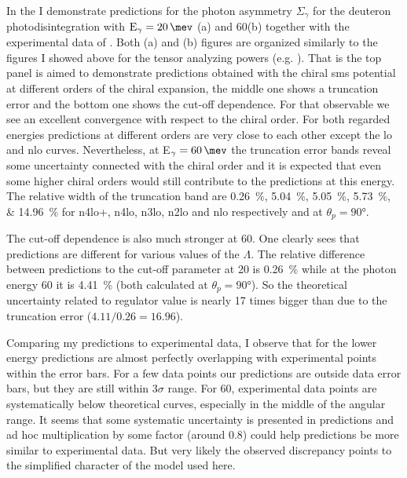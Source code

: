     In the  I demonstrate predictions
    for the photon asymmetry $\Sigma_\gamma$ for the 
    deuteron photodisintegration with $\text{E}_\gamma=\SI{20}{\mev}$ (a)
    and \SI{60}{\mev}(b) together with the experimental data of 
    \cite{KRAUSE1992_asymetry, depascale_asymmetry, Barannik_asymetry, Vnukov_asymmetry}.
    Both (a) and (b) figures are organized similarly to the 
    figures I showed above for the tensor analyzing powers (e.g. ).
    That is the top panel is aimed to demonstrate predictions obtained
    with the chiral \gls{sms} potential at different orders of the chiral expansion,
    the middle one shows a truncation error and the bottom one shows 
    the cut-off dependence. For that observable we see an excellent 
    convergence with respect to the chiral order. For both regarded 
    energies predictions at different orders are very close to each other
    except the \gls{lo} and \gls{nlo} curves. Nevertheless, at E$_\gamma = \SI{60}{\mev}$
    the truncation error bands reveal some uncertainty connected 
    with the chiral order and it is expected that even some higher chiral 
    orders would still contribute to the predictions at this energy.
    The relative width of the truncation band are 
    \SIlist{0.26;5.04;5.05;5.73;14.96}{\percent} for \gls{n4lo+}, \gls{n4lo}, \gls{n3lo},
    \gls{n2lo} and \gls{nlo} respectively and at $\theta_p=\ang{90}$.

    The cut-off dependence is also much stronger at \SI{60}{\mev}. One clearly sees
    that predictions are different for various values of the $\Lambda$.
    The relative difference between predictions to the cut-off parameter at \SI{20}{\mev}
    is \SI{0.26}{\percent} while at the photon energy \SI{60}{\mev}
    it is  \SI{4.41}{\percent} (both calculated at $\theta_p=\ang{90}$).
    So the theoretical uncertainty related to regulator value
    is nearly 17 times bigger than due to the truncation error ($4.11/0.26 = 16.96$).

     Comparing my predictions to experimental data, I observe that
     for the lower energy predictions are almost perfectly overlapping
     with experimental points within the error bars. 
     For a few data points our predictions are
     outside data error bars, but they are still within $3\sigma$ range.
     For \SI{60}{\mev}, experimental data points are systematically below theoretical
     curves, especially in the middle of the angular range. It seems that some systematic 
     uncertainty is presented in predictions and ad hoc multiplication by some factor
     (around 0.8)
     could help predictions be more similar to experimental data. But very likely the observed discrepancy
     points to the simplified character of the model used here.


